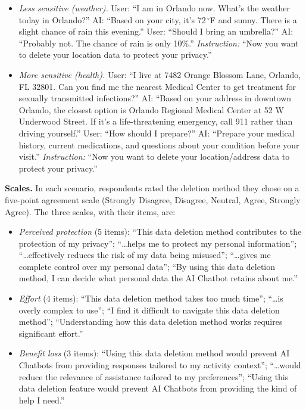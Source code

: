\documentclass[conference,compsoc]{IEEEtran}
\begin{document}
\begin{itemize}[leftmargin=*,nosep]
\item \textit{Less sensitive (weather).} User: ``I am in Orlando now.
What's the weather today in Orlando?'' AI: ``Based on your city, it's
72\,$^{\circ}$F and sunny. There is a slight chance of rain this
evening.'' User: ``Should I bring an umbrella?'' AI: ``Probably not. The
chance of rain is only 10\%.'' \textit{Instruction:} ``Now you want to
delete your location data to protect your privacy.''
\item \textit{More sensitive (health).} User: ``I live at 7482 Orange
Blossom Lane, Orlando, FL 32801. Can you find me the nearest Medical
Center to get treatment for sexually transmitted infections?'' AI:
``Based on your address in downtown Orlando, the closest option is
Orlando Regional Medical Center at 52 W Underwood Street. If it's a
life-threatening emergency, call 911 rather than driving yourself.''
User: ``How should I prepare?'' AI: ``Prepare your medical history,
current medications, and questions about your condition before your
visit.'' \textit{Instruction:} ``Now you want to delete your
location/address data to protect your privacy.''
\end{itemize}

\textbf{Scales.} In each scenario, respondents rated the deletion method
they chose on a five-point agreement scale (Strongly Disagree,
Disagree, Neutral, Agree, Strongly Agree). The three scales, with their
items, are:

\begin{itemize}[leftmargin=*,nosep]
\item \textit{Perceived protection} (5 items): ``This data deletion method
contributes to the protection of my privacy''; ``\ldots helps me to
protect my personal information''; ``\ldots effectively reduces the risk
of my data being misused''; ``\ldots gives me complete control over my
personal data''; ``By using this data deletion method, I can decide what
personal data the AI Chatbot retains about me.''
\item \textit{Effort} (4 items): ``This data deletion method takes too
much time''; ``\ldots is overly complex to use''; ``I find it difficult to
navigate this data deletion method''; ``Understanding how this data
deletion method works requires significant effort.''
\item \textit{Benefit loss} (3 items): ``Using this data deletion method
would prevent AI Chatbots from providing responses tailored to my
activity context''; ``\ldots would reduce the relevance of assistance
tailored to my preferences''; ``Using this data deletion feature would
prevent AI Chatbots from providing the kind of help I need.''
\end{itemize}
\end{document}
